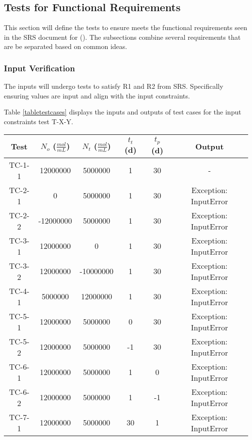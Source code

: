 \documentclass[12pt, titlepage]{article}
\begin{document}
\subsection{Tests for Functional Requirements} \label{tfr}

This section will define the tests to ensure \progname{} meets the functional 
requirements seen in the SRS document for \progname{} (\citep{SRS}). The 
subsections combine 
several requirements that are be separated based on common ideas. 


\subsubsection{Input Verification}

The inputs will undergo tests to satisfy R1 and R2 from \progname{} SRS. 
Specifically ensuring values are input and align with the input constraints. 

Table \ref{tabletestcases} displays the inputs and outputs of test cases for the 
input constraints test T-X-Y.

\begin{center}
 \begin{tabular}{|| c||c c c c|| c ||} 
 \hline
 \textbf{Test} & \textbf{$N_{o}$ ($\frac{mol}{mL}$)} & \textbf{$N_{t}$ ($\frac{mol}{mL}$)} & \textbf{$t_{t}$ (d)} & \textbf{$t_{p}$ (d)} & \textbf{Output}\\ [0.5ex] 
 \hline
 TC-1-1 & 12000000 & 5000000 & 1 & 30 & - \\ 
 \hline
 TC-2-1 & 0 & 5000000 & 1 & 30 & Exception: InputError\\
 \hline
 TC-2-2 & -12000000 & 5000000 & 1 & 30 & Exception: InputError\\
 \hline
 TC-3-1 & 12000000 & 0 & 1 & 30 & Exception: InputError\\
 \hline
 TC-3-2 & 12000000 & -10000000 & 1 & 30 & Exception: InputError\\ 
 \hline
 TC-4-1 & 5000000 & 12000000 & 1 & 30 & Exception: InputError\\ 
 \hline
 TC-5-1 & 12000000 & 5000000 & 0 & 30 & Exception: InputError\\
 \hline
 TC-5-2 & 12000000 & 5000000 & -1 & 30 & Exception: InputError\\
 \hline
 TC-6-1 & 12000000 & 5000000 & 1 & 0 & Exception: InputError\\
 \hline
 TC-6-2 & 12000000 & 5000000 & 1 & -1 & Exception: InputError\\ 
 \hline
 TC-7-1 & 12000000 & 5000000 & 30 & 1 & Exception: InputError\\  [1ex] 
 \hline
\end{tabular}
\label{tabletestcases}

\end{center}		
\end{document}
